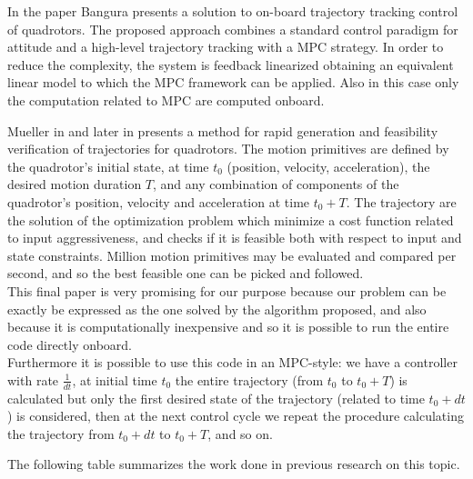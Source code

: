 In the paper \cite{bangura2014real} Bangura presents a solution to on-board trajectory tracking control of quadrotors. The
proposed approach combines a standard control paradigm for attitude and a high-level trajectory tracking with a MPC strategy. 
In order to reduce the complexity, the system is feedback linearized obtaining an equivalent linear model to which the MPC framework can be applied. Also in this case only the computation related to MPC are computed onboard.

Mueller in \cite{mueller2013model} and later in \cite{mueller2015computationally} presents a method for rapid generation and feasibility verification of trajectories for quadrotors. The motion primitives are defined by the quadrotor's initial state, at time $t_0$ (position, velocity, acceleration), the desired motion duration $T$, and any combination of components of the quadrotor's
position, velocity and acceleration at time $t_0+T$. The trajectory are the solution of the optimization problem which minimize a
cost function related to input aggressiveness, and checks if it is feasible both with respect to input and state constraints. Million motion primitives may be evaluated and compared per second, and so the best feasible one can be picked and followed.\\


This final paper is very promising for our purpose because our problem can be exactly be expressed as the one solved by the algorithm proposed, and also because it is computationally inexpensive and so it is possible to run the entire code directly onboard.\\ Furthermore it is possible to use this code in an MPC-style: we have a controller with rate $\frac{1}{dt}$, at initial time $t_0$ the entire trajectory (from $t_0$ to $t_0 + T$) is calculated but only the first desired state of the trajectory (related to time $t_0+dt$) is considered, then at the next control cycle we repeat the procedure calculating the trajectory from $t_0 + dt$ to $t_0 + T$, and so on.

The following table summarizes the work done in previous research on this topic.

